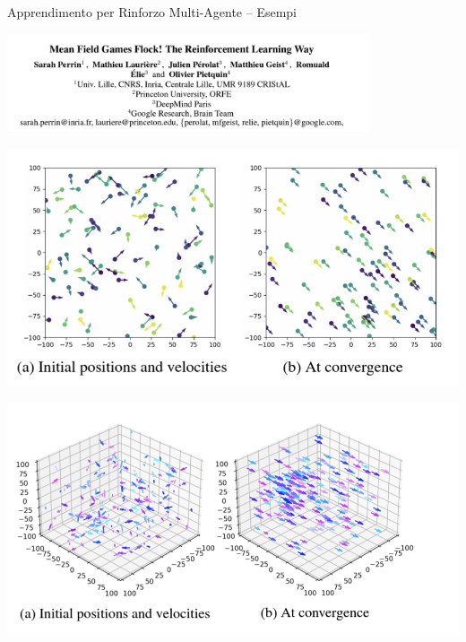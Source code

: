 \documentclass[presentation, 10pt,aspectratio=169]{beamer}\mode<presentation>{\usetheme{AMSBolognaFC}}
\begin{document}
\begin{frame}{Apprendimento per Rinforzo Multi-Agente -- Esempi}
	\begin{center}
	\href{https://arxiv.org/abs/2105.07933}{
	\includegraphics[width=0.8\textwidth]{img/learning-to-flock}}
	\end{center}
	\begin{center}
	\begin{minipage}{0.45\textwidth}
	\centering
	\includegraphics[width=\textwidth]{img/flock-3.png}
	\end{minipage}
	\hfill
	\begin{minipage}{0.45\textwidth}
	\centering
	\includegraphics[width=\textwidth]{img/flock-2.png}
	\end{minipage}
	\end{center}
\end{frame}
\end{document}
